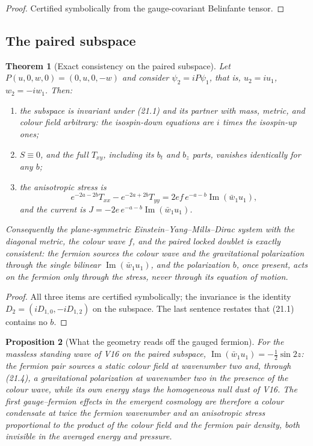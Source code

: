 \documentclass[11pt]{article}
\newtheorem{theorem}{Theorem}[section]
\newtheorem{proposition}[theorem]{Proposition}
\theoremstyle{remark}
\begin{document}
\begin{proof}
Certified symbolically from the gauge-covariant Belinfante tensor.
\end{proof}

\subsection{The paired subspace}

\begin{theorem}[Exact consistency on the paired subspace]
\label{thm:v20v18-paired}
Let \(P(u,0,w,0)=(0,u,0,-w)\) and consider \(\psi_2=iP\psi_1\), that
is, \(u_2=iu_1\), \(w_2=-iw_1\).  Then:
\begin{enumerate}
\item the subspace is invariant under (21.1) and its partner with
mass, metric, and colour field arbitrary: the isospin-down equations
are \(i\) times the isospin-up ones;
\item \(S\equiv0\), and the full \(T_{xy}\), including its \(b_t\) and
\(b_z\) parts, vanishes identically for any \(b\);
\item the anisotropic stress is
\[
 e^{-2a-2b}T_{xx}-e^{-2a+2b}T_{yy}=2ef\,e^{-a-b}\operatorname{Im}(\bar w_1u_1),
                                                                    \tag{21.4}
\]
and the current is \(J=-2e\,e^{-a-b}\operatorname{Im}(\bar w_1u_1)\).
\end{enumerate}
Consequently the plane-symmetric Einstein--Yang--Mills--Dirac system
with the diagonal metric, the colour wave \(f\), and the paired locked
doublet is exactly consistent: the fermion sources the colour wave
and the gravitational polarization through the single bilinear
\(\operatorname{Im}(\bar w_1u_1)\), and the polarization \(b\), once
present, acts on the fermion only through the stress, never through
its equation of motion.
\end{theorem}

\begin{proof}
All three items are certified symbolically; the invariance is the
identity \(D_2=(iD_{1,0},-iD_{1,2})\) on the subspace.  The last
sentence restates that (21.1) contains no \(b\).
\end{proof}

\begin{proposition}[What the geometry reads off the gauged fermion]
\label{prop:v20v18-reading}
For the massless standing wave of V16 on the paired subspace,
\(\operatorname{Im}(\bar w_1u_1)=-\tfrac12\sin2z\): the fermion pair
sources a static colour field at wavenumber two and, through (21.4),
a gravitational polarization at wavenumber two in the presence of the
colour wave, while its own energy stays the homogeneous null dust of
V16.  The first gauge--fermion effects in the emergent cosmology are
therefore a colour condensate at twice the fermion wavenumber and an
anisotropic stress proportional to the product of the colour field
and the fermion pair density, both invisible in the averaged energy
and pressure.
\end{proposition}
\end{document}

